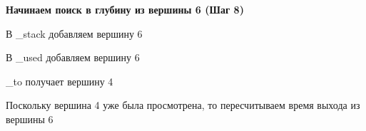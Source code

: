 \documentclass[a4paper]{article}
\begin{document}
\textbf{Начинаем поиск в глубину из вершины 6 (Шаг 8)}
  \begin{figure}[!h]
  \end{figure}
\par
  В \_stack добавляем вершину 6\par
  В \_used добавляем вершину 6\par
  \_to получает вершину 4\par
\newpage

  \begin{figure}[!h]
  \end{figure}
\par
  Поскольку вершина 4 уже была просмотрена, то пересчитываем время выхода из вершины 6\par
\newpage
\end{document}
